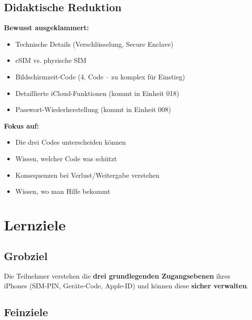 \documentclass[11pt,a4paper]{article}
\begin{document}
\subsection{Didaktische Reduktion}

\textbf{Bewusst ausgeklammert:}
\begin{itemize}
    \item Technische Details (Verschlüsselung, Secure Enclave)
    \item eSIM vs. physische SIM
    \item Bildschirmzeit-Code (4. Code -- zu komplex für Einstieg)
    \item Detaillierte iCloud-Funktionen (kommt in Einheit 018)
    \item Passwort-Wiederherstellung (kommt in Einheit 008)
\end{itemize}

\textbf{Fokus auf:}
\begin{itemize}
    \item Die drei Codes unterscheiden können
    \item Wissen, welcher Code was schützt
    \item Konsequenzen bei Verlust/Weitergabe verstehen
    \item Wissen, wo man Hilfe bekommt
\end{itemize}

\section{Lernziele}

\subsection{Grobziel}

Die Teilnehmer verstehen die \textbf{drei grundlegenden Zugangsebenen} ihres iPhones (SIM-PIN, Geräte-Code, Apple-ID) und können diese \textbf{sicher verwalten}.

\subsection{Feinziele}
\end{document}
